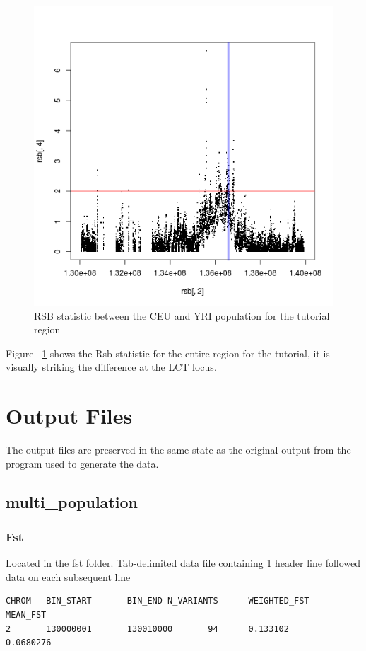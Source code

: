 \documentclass[a4paper,10pt]{article}
\begin{document}
\begin{figure}
\centering
\includegraphics{pictures/RSBCEUYRI.png}
\caption{RSB statistic between the CEU and YRI population for the tutorial region} 
\label{fig:rsb}
\end{figure}
Figure ~\ref{fig:rsb} shows the Rsb statistic for the entire region for the tutorial, it is visually striking the difference at the LCT locus.

\pagebreak
\section{Output Files}
The output files are preserved in the same state as the original output from the program used to generate the data.
\subsection{multi\_population}
\subsubsection{Fst}
Located in the fst folder. Tab-delimited data file containing 1 header line followed data on each subsequent line\\
\begin{verbatim}
CHROM   BIN_START       BIN_END N_VARIANTS      WEIGHTED_FST    MEAN_FST  
2       130000001       130010000       94      0.133102        0.0680276 
\end{verbatim}
\end{document}

